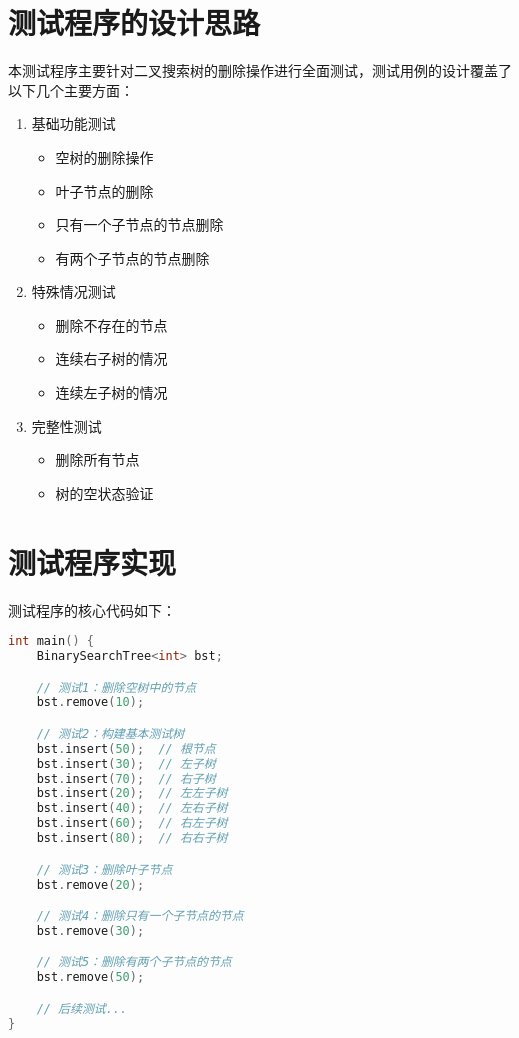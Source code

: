 \documentclass[UTF8]{ctexart}
\begin{document}
\pagestyle{fancy}
\fancyhead{}
\rhead{\today}

\section{测试程序的设计思路}

本测试程序主要针对二叉搜索树的删除操作进行全面测试，测试用例的设计覆盖了以下几个主要方面：

\begin{enumerate}
    \item 基础功能测试
    \begin{itemize}
        \item 空树的删除操作
        \item 叶子节点的删除
        \item 只有一个子节点的节点删除
        \item 有两个子节点的节点删除
    \end{itemize}
    
    \item 特殊情况测试
    \begin{itemize}
        \item 删除不存在的节点
        \item 连续右子树的情况
        \item 连续左子树的情况
    \end{itemize}
    
    \item 完整性测试
    \begin{itemize}
        \item 删除所有节点
        \item 树的空状态验证
    \end{itemize}
\end{enumerate}

\section{测试程序实现}

测试程序的核心代码如下：

\begin{lstlisting}[language=C++]
int main() {
    BinarySearchTree<int> bst;

    // 测试1：删除空树中的节点
    bst.remove(10);

    // 测试2：构建基本测试树
    bst.insert(50);  // 根节点
    bst.insert(30);  // 左子树
    bst.insert(70);  // 右子树
    bst.insert(20);  // 左左子树
    bst.insert(40);  // 左右子树
    bst.insert(60);  // 右左子树
    bst.insert(80);  // 右右子树

    // 测试3：删除叶子节点
    bst.remove(20);

    // 测试4：删除只有一个子节点的节点
    bst.remove(30);

    // 测试5：删除有两个子节点的节点
    bst.remove(50);

    // 后续测试...
}
\end{lstlisting}
\end{document}

